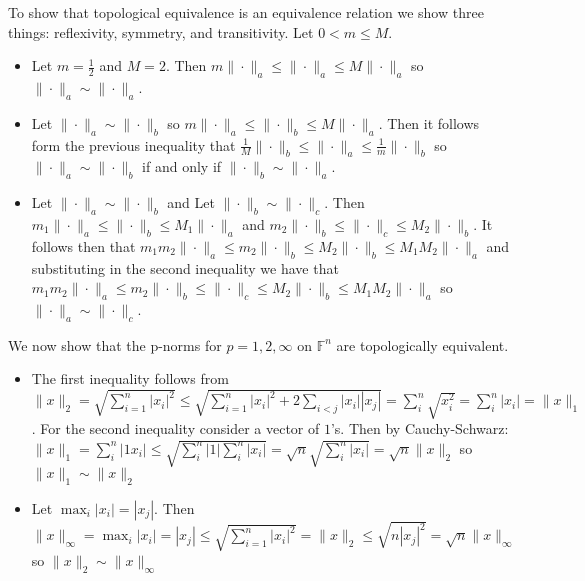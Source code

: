 \documentclass[12pt]{article}
\newcommand{\F}{\mathbb{F}}
\newenvironment{problem}[2][Problem]{\begin{trivlist}
\item[\hskip \labelsep {\bfseries #1}\hskip \labelsep {\bfseries #2}]}{\end{trivlist}}
\begin{document}
\begin{problem}{26.} To show that topological equivalence is an equivalence relation we show three things: reflexivity, symmetry, and transitivity. Let $0 < m \leq M$. 
\begin{itemize}
\item [(i)] Let $m  = \frac{1}{2}$ and $M = 2$. Then $m\|\cdot\|_a \leq \|\cdot\|_a \leq M\|\cdot\|_a$ so $\|\cdot\|_a \sim \|\cdot\|_a$. 
\item [(ii)] Let $\|\cdot\|_a \sim \|\cdot\|_b$ so $m\|\cdot\|_a \leq \|\cdot\|_b \leq M\|\cdot\|_a$. Then it follows form the previous inequality that  $\frac{1}{M}\|\cdot\|_b \leq \|\cdot\|_a \leq \frac{1}{m}\|\cdot\|_b$ so $\|\cdot\|_a \sim \|\cdot\|_b$ if and only if $\|\cdot\|_b \sim \|\cdot\|_a$. 
\item [(iii)] Let $\|\cdot\|_a \sim \|\cdot\|_b$ and Let $\|\cdot\|_b \sim \|\cdot\|_c$. Then $m_1\|\cdot\|_a \leq \|\cdot\|_b \leq M_1\|\cdot\|_a$ and $m_2\|\cdot\|_b \leq \|\cdot\|_c \leq M_2\|\cdot\|_b$. It follows then that $m_1m_2\|\cdot\|_a \leq m_2\|\cdot\|_b \leq M_2\|\cdot\|_b \leq M_1M_2\|\cdot\|_a$ and substituting in the second inequality we have that $m_1m_2\|\cdot\|_a \leq m_2\|\cdot\|_b \leq \|\cdot\|_c \leq M_2\|\cdot\|_b \leq M_1M_2\|\cdot\|_a$ so $\|\cdot\|_a \sim \|\cdot\|_c$. 
\end{itemize} 
We now show that the p-norms for $p = 1,2,\infty$ on $\F^n$ are topologically equivalent. 
\begin{itemize}
\item [(i)]  The first inequality follows from $\|x\|_2 = \sqrt{\sum_{i=1}^n |x_i|^2} \leq   \sqrt{\sum_{i=1}^n |x_i|^2  + 2 \sum_{i<j}|x_i||x_j|} =\sum_i^n \sqrt{x_i^2} =  \sum_i^n |x_i| =  \|x\|_1$. For the second inequality consider a vector of $1$'s. Then by Cauchy-Schwarz: $\|x\|_1 = \sum_i^n |1x_i| \leq \sqrt{ \sum_i^n |1| \sum_i^n |x_i|} = \sqrt{n}\sqrt{ \sum_i^n |x_i|} = \sqrt{n}\|x\|_2$ so $\|x\|_1 \sim \|x\|_{2}$
\item [(ii)] Let $\max_i |x_i| =  |x_j|$. Then $\|x\|_{\infty} = \max_i |x_i| =  |x_j| \leq \sqrt{\sum_{i=1}^n |x_i|^2} = \|x\|_2 \leq \sqrt{n |x_j|^2} = \sqrt{n} \|x\|_{\infty}$ so $\|x\|_2 \sim \|x\|_{\infty}$
\end{itemize} 
\end{problem}
\end{document}
